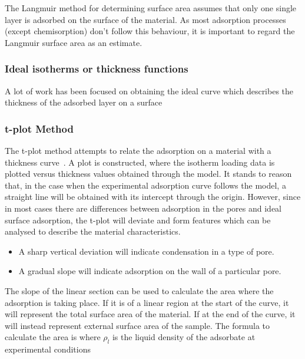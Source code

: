 The Langmuir method for determining surface area assumes that only one single
layer is adsorbed on the surface of the material. As most adsorption processes
(except chemisorption) don't follow this behaviour, it is important to regard
the Langmuir surface area as an estimate.

\subsubsection{Ideal isotherms or thickness functions}

A lot of work has been focused on obtaining the ideal curve 
which describes the thickness of the adsorbed
layer on a surface

\subsubsection{t-plot Method}

The t-plot method attempts to relate the adsorption on a material
with a thickness curve~\cite{lippensStudiesPoreSystems1965}. 
A plot is constructed, where the isotherm loading
data is plotted versus thickness values obtained through the model.
It stands to reason that, in the case when the experimental adsorption
curve follows the model, a straight line will be obtained with its
intercept through the origin. However, since in most cases there
are differences between adsorption in the pores and ideal surface
adsorption, the t-plot will deviate and form features which can
be analysed to describe the material characteristics.

\begin{itemize}

	\item A sharp vertical deviation will indicate condensation
	      in a type of pore.
	\item A gradual slope will indicate adsorption on the
	      wall of a particular pore.

\end{itemize}

The slope of the linear section can be used to calculate the area where
the adsorption is taking place. If it is of a linear region at the start
of the curve, it will represent the total surface area of the material.
If at the end of the curve, it will instead represent external surface
area of the sample. The formula to calculate the area is
where \(\rho_{l}\) is the liquid density of the adsorbate at experimental
conditions

